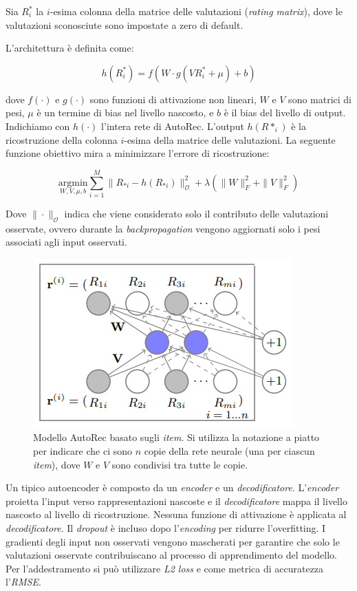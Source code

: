 Sia $R^*_i$ la $i$-esima colonna della matrice delle valutazioni (\textit{rating matrix}), dove le valutazioni sconosciute sono impostate a zero di default.

L'architettura è definita come:

\[
h(R^*_i) = f\left( W \cdot g\left( VR^*_i + \mu \right) + b \right)
\]

dove $f(\cdot)$ e $g(\cdot)$ sono funzioni di attivazione non lineari, $W$ e $V$ sono matrici di pesi, $\mu$ è un termine di bias nel livello nascosto, e $b$ è il bias del livello di output. Indichiamo con $h(\cdot)$ l'intera rete di AutoRec. L'output $h(R*_{i})$ è la ricostruzione della colonna $i$-esima della matrice delle valutazioni. La seguente funzione obiettivo mira a minimizzare l'errore di ricostruzione:

\[
\underset{W, V, \mu, b}{\mathrm{argmin}} \sum_{i=1}^M{\parallel R_{*i} - h(R_{*i}) \parallel_{\mathcal{O}}^2} + \lambda(\| W \|_F^2 + \| V \|_F^2)
\]

Dove $ \| \cdot \|_{\mathcal{O}}$ indica che viene considerato solo il contributo delle valutazioni osservate, ovvero durante la \textit{backpropagation} vengono aggiornati solo i pesi associati agli input osservati.

\begin{figure}[htbp]
    \centering
    \includegraphics[keepaspectratio]{figures/algorithms/auto_rc.PNG}
    \caption{Modello AutoRec basato sugli \textit{item}. Si utilizza la notazione a piatto per indicare che ci sono $n$ copie della rete neurale (una per ciascun \textit{item}), dove $W$ e $V$ sono condivisi tra tutte le copie.}
    \label{fig:auto_rec}
\end{figure}

Un tipico autoencoder è composto da un \textit{encoder} e un \textit{decodificatore}. L'\textit{encoder} proietta l'input verso rappresentazioni nascoste e il \textit{decodificatore} mappa il livello nascosto al livello di ricostruzione. Nessuna funzione di attivazione è applicata al \textit{decodificatore}. Il \textit{dropout} è incluso dopo l'\textit{encoding} per ridurre l'overfitting. I gradienti degli input non osservati vengono mascherati per garantire che solo le valutazioni osservate contribuiscano al processo di apprendimento del modello. Per l'addestramento si può utilizzare \textit{L2 loss} e come metrica di accuratezza l'\textit{RMSE}.

